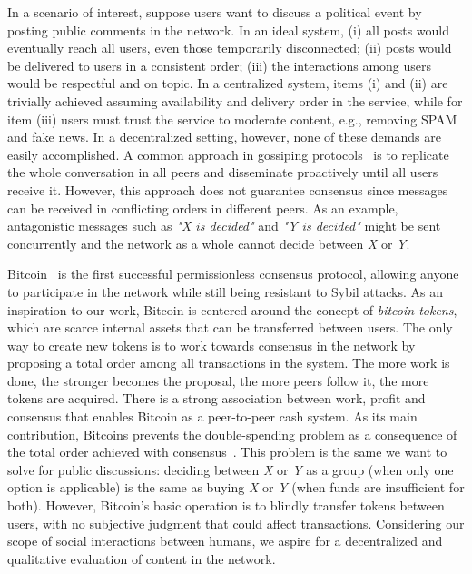 \documentclass[10pt,journal,compsoc]{IEEEtran}
\begin{document}
In a scenario of interest, suppose users want to discuss a political event by
posting public comments in the network.
In an ideal system,
(i)   all posts would eventually reach all users, even those temporarily
      disconnected;
(ii)  posts would be delivered to users in a consistent order;
(iii) the interactions among users would be respectful and on topic.
In a centralized system, items (i) and (ii) are trivially achieved assuming
availability and delivery order in the service, while for item (iii) users must
trust the service to moderate content, e.g., removing SPAM and fake news.
In a decentralized setting, however, none of these demands are easily
accomplished.
A common approach in gossiping protocols~\cite{p2p.survey} is to replicate the
whole conversation in all peers and disseminate proactively until all users
receive it.
However, this approach does not guarantee consensus since messages can be
received in conflicting orders in different peers.
As an example, antagonistic messages such as \emph{"X is decided"} and
\emph{"Y is decided"} might be sent concurrently and the network as a whole
cannot decide between \emph{X} or \emph{Y}.

Bitcoin~\cite{p2p.bitcoin} is the first successful permissionless consensus
protocol, allowing anyone to participate in the network while still being
resistant to Sybil attacks.
%
As an inspiration to our work, Bitcoin is centered around the concept of
\emph{bitcoin tokens}, which are scarce internal assets that can be transferred
between users.
The only way to create new tokens is to work towards consensus in the network
by proposing a total order among all transactions in the system.
The more work is done, the stronger becomes the proposal, the more peers follow
it, the more tokens are acquired.
There is a strong association between work, profit and consensus that enables
Bitcoin as a peer-to-peer cash system.
%
As its main contribution, Bitcoins prevents the double-spending problem as a
consequence of the total order achieved with consensus~\cite{p2p.bitcoin}.
This problem is the same we want to solve for public discussions:
deciding between \emph{X} or \emph{Y} as a group (when only one option is
applicable) is the same as buying \emph{X} or \emph{Y} (when funds are
insufficient for both).
%
However, Bitcoin's basic operation is to blindly transfer tokens between users,
with no subjective judgment that could affect transactions.
Considering our scope of social interactions between humans, we aspire for a
decentralized and qualitative evaluation of content in the network.
\end{document}
